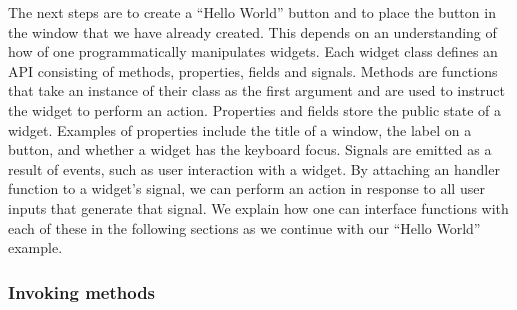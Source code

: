 \documentclass[article,shortnames]{jss}
\begin{document}
The next steps are to create a ``Hello World'' button and to place the
button in the window that we have already created. This depends on an
understanding of how of one programmatically manipulates widgets.
Each widget class defines an API consisting of methods, properties,
fields and signals. Methods are functions that take an instance of
their class as the first argument and are used to instruct the widget
to perform an action. Properties and fields store the public state of
a widget. Examples of properties include the title of a window, the
label on a button, and whether a widget has the keyboard focus.
Signals are emitted as a result of events, such as user interaction
with a widget.
By attaching an  handler function to a widget's signal, we
can
perform an action in response to all user inputs that generate that
signal. We explain how one can interface  functions with
each of these in the following sections as we continue with our
``Hello World'' example.

\subsubsection{Invoking methods}
\end{document}
